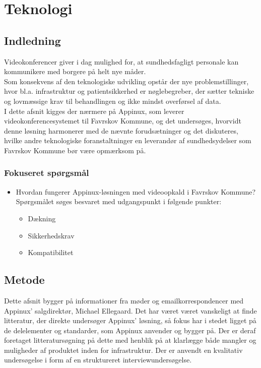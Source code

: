 \chapter{Teknologi}
\label{chap:teknologiafsnit}
\section{Indledning}

Videokonferencer giver i dag mulighed for, at sundhedsfagligt personale kan kommunikere med borgere på helt nye måder.
\\
Som konsekvens af den teknologiske udvikling opstår der nye problemstillinger, hvor bl.a. infrastruktur og patientsikkerhed er nøglebegreber, der sætter tekniske og lovmæssige krav til behandlingen og ikke mindst overførsel af data.
\\
I dette afsnit kigges der nærmere på Appinux, som leverer videokonferencesystemet til Favrskov Kommune, og det undersøges, hvorvidt denne løsning harmonerer med de nævnte forudsætninger og det diskuteres, hvilke andre teknologiske foranstaltninger en leverandør af sundhedsydelser som Favrskov Kommune bør være opmærksom på.

\subsection{Fokuseret spørgsmål}
\begin{itemize}
	\item Hvordan fungerer Appinux-løsningen med videoopkald i Favrskov Kommune? \\Spørgsmålet søges besvaret med udgangspunkt i følgende punkter:
	\begin{itemize}
	\item Dækning
	\item Sikkerhedskrav 
	\item Kompatibilitet 
\end{itemize}
\end{itemize}


\section{Metode}
Dette afsnit bygger på informationer fra møder og emailkorrespondencer med Appinux' salgdirektør, Michael Ellegaard. Det har været været vanskeligt at finde litteratur, der direkte undersøger Appinux' løsning, så fokus har i stedet ligget på de delelementer og standarder, som Appinux anvender og bygger på. Der er deraf foretaget litteratursøgning på dette med henblik på at klarlægge både mangler og muligheder af produktet inden for infrastruktur. Der er anvendt en kvalitativ undersøgelse i form af en struktureret interviewundersøgelse.

